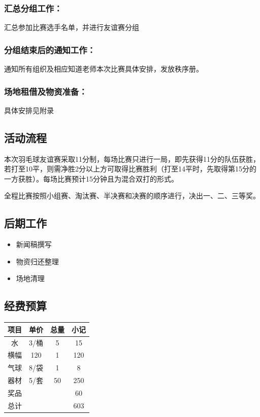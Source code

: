\documentclass{article}
\begin{document}
\begin{CJK}{UTF8}{gbsn}
\subsubsection{汇总分组工作：}汇总参加比赛选手名单，并进行友谊赛分组
\subsubsection{分组结束后的通知工作：}通知所有组织及相应知道老师本次比赛具体安排，发放秩序册。
\subsubsection{场地租借及物资准备：}具体安排见附录

\subsection{活动流程}
本次羽毛球友谊赛采取11分制，每场比赛只进行一局，即先获得11分的队伍获胜，若打至10平，则需净胜2分以上方可取得比赛胜利（打至14平时，先取得第15分的一方获胜）。每场比赛预计15分钟且为混合双打的形式。

全程比赛按照小组赛、淘汰赛、半决赛和决赛的顺序进行，决出一、二、三等奖。

\subsection{后期工作}
\begin{itemize}
\item 新闻稿撰写
\item 物资归还整理
\item 场地清理
\end{itemize}


\subsection{经费预算}
		\begin{table}[htbp]
			\centering
			\begin{tabular}{|c|c|c|c|}
				\hline

项目	&单价	&总量&	小记\\\hline
水	&3/桶&	5&	15\\\hline
横幅&	120	&1&	120\\\hline
气球&	8/袋&	1&	8\\\hline
器材	&5/套&	50&	250\\\hline
奖品	&	&	&60\\\hline
总计&		&&	603\\\hline


\end{tabular}
\end{table}
\end{CJK}
\end{document}
